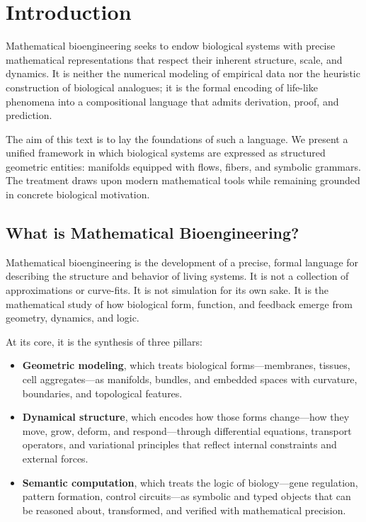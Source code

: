 
\section{Introduction}

Mathematical bioengineering seeks to endow biological systems with precise mathematical representations that respect their inherent structure, scale, and dynamics. It is neither the numerical modeling of empirical data nor the heuristic construction of biological analogues; it is the formal encoding of life-like phenomena into a compositional language that admits derivation, proof, and prediction.

The aim of this text is to lay the foundations of such a language. We present a unified framework in which biological systems are expressed as structured geometric entities: manifolds equipped with flows, fibers, and symbolic grammars. The treatment draws upon modern mathematical tools while remaining grounded in concrete biological motivation.

\subsection{What is Mathematical Bioengineering?}

Mathematical bioengineering is the development of a precise, formal language for describing the structure and behavior of living systems. It is not a collection of approximations or curve-fits. It is not simulation for its own sake. It is the mathematical study of how biological form, function, and feedback emerge from geometry, dynamics, and logic.

At its core, it is the synthesis of three pillars:

\begin{itemize}
  \item \textbf{Geometric modeling}, which treats biological forms—membranes, tissues, cell aggregates—as manifolds, bundles, and embedded spaces with curvature, boundaries, and topological features.
  
  \item \textbf{Dynamical structure}, which encodes how those forms change—how they move, grow, deform, and respond—through differential equations, transport operators, and variational principles that reflect internal constraints and external forces.
  
  \item \textbf{Semantic computation}, which treats the logic of biology—gene regulation, pattern formation, control circuits—as symbolic and typed objects that can be reasoned about, transformed, and verified with mathematical precision.
\end{itemize}

